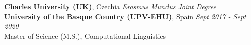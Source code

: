 
{\textbf{Charles University (UK)}, Czechia} \hfill
        {\em Erasmus Mundus Joint Degree}\\
{\textbf{University of the Basque Country (UPV-EHU)}, Spain} \hfill
    {\textit{Sept 2017 - Sept 2020}}\\
        Master of Science (M.S.), Computational Linguistics